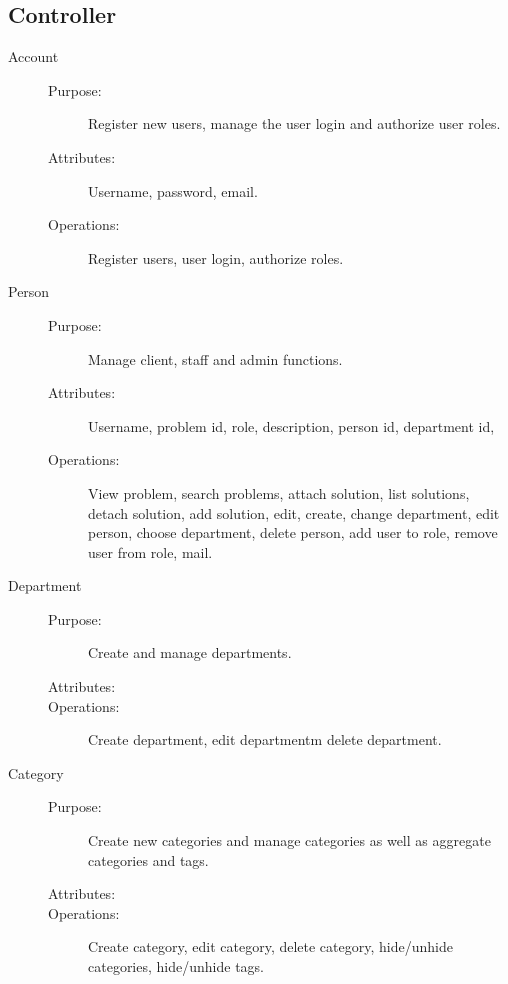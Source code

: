 \subsection{Controller}

\begin{description}
\item[Account]\hfill
\begin{description}
\item[Purpose:]Register new users, manage the user login and authorize user roles.
\item[Attributes:] Username, password, email.
\item[Operations:]Register users, user login, authorize roles.
\end{description}
\end{description}

\begin{description}
\item[Person]\hfill
\begin{description}
\item[Purpose:]Manage client, staff and admin functions.
\item[Attributes:] Username, problem id, role, description, person id, department id, 
\item[Operations:]View problem, search problems, attach solution, list solutions, detach solution, add solution, edit, create, change department, edit person, choose department, delete person, add user to role, remove user from role, mail.
\end{description}
\end{description}

\begin{description}
\item[Department]\hfill
\begin{description}
\item[Purpose:]Create and manage departments.
\item[Attributes:]
\item[Operations:]Create department, edit departmentm delete department.
\end{description}
\end{description}

\begin{description}
\item[Category]\hfill
\begin{description}
\item[Purpose:]Create new categories and manage categories as well as aggregate categories and tags.
\item[Attributes:]
\item[Operations:]Create category, edit category, delete category, hide/unhide categories, hide/unhide tags.
\end{description}
\end{description}

